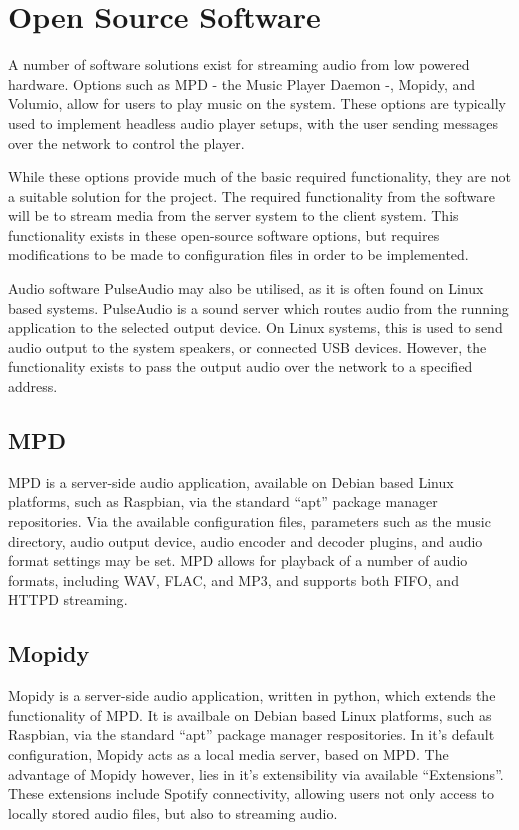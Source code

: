 \documentclass[11pt,a4paper]{scrreprt}
\begin{document}
\section{Open Source Software}\label{open-source-software}

A number of software solutions exist for streaming audio from low
powered hardware. Options such as MPD - the Music Player Daemon -,
Mopidy, and Volumio, allow for users to play music on the system. These
options are typically used to implement headless audio player setups,
with the user sending messages over the network to control the player.

While these options provide much of the basic required functionality,
they are not a suitable solution for the project. The required
functionality from the software will be to stream media from the server
system to the client system. This functionality exists in these
open-source software options, but requires modifications to be made to
configuration files in order to be implemented.

Audio software PulseAudio may also be utilised, as it is often found on
Linux based systems. PulseAudio is a sound server which routes audio
from the running application to the selected output device. On Linux
systems, this is used to send audio output to the system speakers, or
connected USB devices. However, the functionality exists to pass the
output audio over the network to a specified address\cite{Pulse14}.

\subsection{MPD}\label{mpd}

MPD is a server-side audio application, available on Debian based Linux
platforms, such as Raspbian, via the standard ``apt'' package manager
repositories. Via the available configuration files, parameters such as
the music directory, audio output device, audio encoder and decoder
plugins, and audio format settings may be set. MPD allows for playback
of a number of audio formats, including WAV, FLAC, and MP3, and supports
both FIFO, and HTTPD streaming\cite{MPD18}.

\subsection{Mopidy}\label{mopidy}

Mopidy is a server-side audio application, written in python, which
extends the functionality of MPD. It is availbale on Debian based Linux
platforms, such as Raspbian, via the standard ``apt'' package manager
respositories. In it's default configuration, Mopidy acts as a local
media server, based on MPD. The advantage of Mopidy however, lies in
it's extensibility via available ``Extensions''. These extensions
include Spotify connectivity, allowing users not only access to locally
stored audio files, but also to streaming audio.
\end{document}
